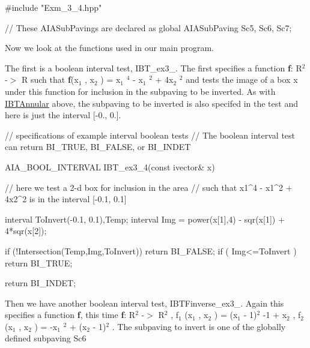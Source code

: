 \begin{DoxyCodeInclude}
#include "Exm_3_4.hpp"

// These AIASubPavings are declared as global
AIASubPaving Sc5, Sc6, Sc7;

\end{DoxyCodeInclude}


\-Now we look at the functions used in our main program.

\-The first is a boolean interval test, \label{AIASubPavings_IBT_ex3_4}%
\hypertarget{AIASubPavings_IBT_ex3_4}{}%
\-I\-B\-T\-\_\-ex3\-\_. \-The first specifies a function {\bfseries f}\-: \-R$^{\mbox{2}}$  -\/$>$ \-R such that {\bfseries f}(x$_{\mbox{1}}$ , x$_{\mbox{2}}$ ) = x$_{\mbox{1}}$ $^{\mbox{4}}$  -\/ x$_{\mbox{1}}$ $^{\mbox{2}}$  + 4x$_{\mbox{2}}$ $^{\mbox{2}}$  and tests the image of a box x under this function for inclusion in the subpaving to be inverted. \-As with \hyperlink{AIASubPavings_IBTAnnular}{\-I\-B\-T\-Annular} above, the subpaving to be inverted is also specifed in the test and here is just the interval \mbox{[}-\/0., 0.\mbox{]}.


\begin{DoxyCodeInclude}
// specifications of example interval boolean tests
// The boolean interval test can return BI_TRUE, BI_FALSE, or BI_INDET

AIA_BOOL_INTERVAL IBT_ex3_4(const ivector& x)
{
  // here we test a 2-d box for inclusion in the area 
  // such that x1^4 - x1^2 + 4x2^2 is in the interval [-0.1, 0.1]

  interval ToInvert(-0.1, 0.1),Temp;
  interval Img = power(x[1],4) - sqr(x[1]) + 4*sqr(x[2]);

  if (!Intersection(Temp,Img,ToInvert)) return BI_FALSE;
  if ( Img<=ToInvert ) return BI_TRUE;

  return BI_INDET;
}

\end{DoxyCodeInclude}


\-Then we have another boolean interval test, \label{AIASubPavings_IBTinverse_ex3_4}%
\hypertarget{AIASubPavings_IBTinverse_ex3_4}{}%
\-I\-B\-T\-Finverse\-\_\-ex3\-\_. \-Again this specifies a function {\bfseries f}, this time {\bfseries f}\-: \-R$^{\mbox{2}}$  -\/$>$ \-R$^{\mbox{2}}$ , f$_{\mbox{1}}$ (x$_{\mbox{1}}$ , x$_{\mbox{2}}$ ) = (x$_{\mbox{1}}$  -\/ 1)$^{\mbox{2}}$  -\/1 + x$_{\mbox{2}}$ , f$_{\mbox{2}}$ (x$_{\mbox{1}}$ , x$_{\mbox{2}}$ ) = -\/x$_{\mbox{1}}$ $^{\mbox{2}}$  + (x$_{\mbox{2}}$  -\/ 1)$^{\mbox{2}}$ . \-The subpaving to invert is one of the globally defined subpaving \-Sc6


